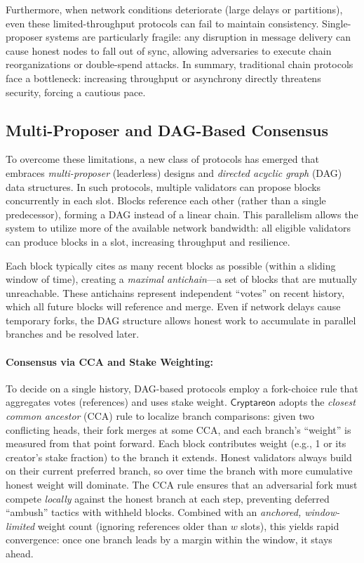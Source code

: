 \documentclass[11pt]{article}
\newcommand{\Proj}{\ensuremath{\mathsf{Cryptareon}}\xspace}
\begin{document}
Furthermore, when network conditions deteriorate (large delays or partitions), even these limited-throughput protocols can fail to maintain consistency. Single-proposer systems are particularly fragile: any disruption in message delivery can cause honest nodes to fall out of sync, allowing adversaries to execute chain reorganizations or double-spend attacks. In summary, traditional chain protocols face a bottleneck: increasing throughput or asynchrony directly threatens security, forcing a cautious pace.

\subsection{Multi-Proposer and DAG-Based Consensus}
To overcome these limitations, a new class of protocols has emerged that embraces {\em multi-proposer} (leaderless) designs and {\em directed acyclic graph} (DAG) data structures. In such protocols, multiple validators can propose blocks concurrently in each slot. Blocks reference each other (rather than a single predecessor), forming a DAG instead of a linear chain. This parallelism allows the system to utilize more of the available network bandwidth: all eligible validators can produce blocks in a slot, increasing throughput and resilience.

Each block typically cites as many recent blocks as possible (within a sliding window of time), creating a {\em maximal antichain}---a set of blocks that are mutually unreachable. These antichains represent independent “votes” on recent history, which all future blocks will reference and merge. Even if network delays cause temporary forks, the DAG structure allows honest work to accumulate in parallel branches and be resolved later.

\paragraph{Consensus via CCA and Stake Weighting:}
To decide on a single history, DAG-based protocols employ a fork-choice rule that aggregates votes (references) and uses stake weight. \Proj adopts the \emph{closest common ancestor} (CCA) rule to localize branch comparisons: given two conflicting heads, their fork merges at some CCA, and each branch's ``weight'' is measured from that point forward. Each block contributes weight (e.g., 1 or its creator's stake fraction) to the branch it extends. Honest validators always build on their current preferred branch, so over time the branch with more cumulative honest weight will dominate. The CCA rule ensures that an adversarial fork must compete \emph{locally} against the honest branch at each step, preventing deferred ``ambush'' tactics with withheld blocks. Combined with an \emph{anchored, window-limited} weight count (ignoring references older than $w$ slots), this yields rapid convergence: once one branch leads by a margin within the window, it stays ahead.
\end{document}
